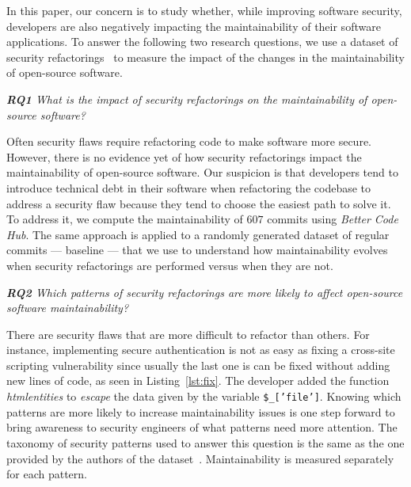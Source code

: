 \documentclass[10pt,conference]{IEEEtran}
\begin{document}
In this paper, our concern is to study whether, while improving software
security, developers are also negatively impacting the maintainability of their
software applications. To answer the following two research questions, we use a
dataset of security refactorings~\cite{Reis:2017:IJSSE} to measure the impact of
the changes in the maintainability of open-source software.

\begin{framed}
\textit{\textbf{RQ1} What is the impact of security refactorings on the
maintainability of open-source software?}
\end{framed}

Often security flaws require refactoring code to make software more secure.
However, there is no evidence yet of how security refactorings impact the
maintainability of open-source software. Our suspicion is that developers tend
to introduce technical debt in their software when refactoring the codebase to
address a security flaw because they tend to choose the easiest path to solve
it. To address it, we compute the maintainability of $607$ commits using
\emph{Better Code Hub}. The same approach is applied to a randomly generated
dataset of regular commits --- baseline --- that we use to understand how
maintainability evolves when security refactorings are performed versus when
they are not.

\begin{framed}
\textit{\textbf{RQ2} Which patterns of security refactorings are more likely to
affect open-source software maintainability?}
\end{framed}

There are security flaws that are more difficult to refactor than others. For
instance, implementing secure authentication is not as easy as fixing a
cross-site scripting vulnerability since usually the last one is can be fixed
without adding new lines of code, as seen in Listing~\ref{lst:fix}. The developer added the function \emph{htmlentities} to
\textit{escape} the data given by the variable \texttt{\$\_['file']}. Knowing which
patterns are more likely to increase maintainability issues is one step forward
to bring awareness to security engineers of what patterns need more attention.
The taxonomy of security patterns used to answer this question is the same as
the one provided by the authors of the dataset~\cite{Reis:2017:IJSSE}.
Maintainability is measured separately for each pattern.
\end{document}
